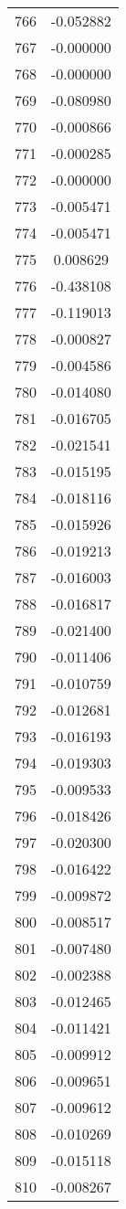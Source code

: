 \documentclass[12pt]{article}
\begin{document}
\begin{longtable}{@{}cc@{}}
766 & -0.052882 \\
767 & -0.000000 \\
768 & -0.000000 \\
769 & -0.080980 \\
770 & -0.000866 \\
771 & -0.000285 \\
772 & -0.000000 \\
773 & -0.005471 \\
774 & -0.005471 \\
775 & 0.008629 \\
776 & -0.438108 \\
777 & -0.119013 \\
778 & -0.000827 \\
779 & -0.004586 \\
780 & -0.014080 \\
781 & -0.016705 \\
782 & -0.021541 \\
783 & -0.015195 \\
784 & -0.018116 \\
785 & -0.015926 \\
786 & -0.019213 \\
787 & -0.016003 \\
788 & -0.016817 \\
789 & -0.021400 \\
790 & -0.011406 \\
791 & -0.010759 \\
792 & -0.012681 \\
793 & -0.016193 \\
794 & -0.019303 \\
795 & -0.009533 \\
796 & -0.018426 \\
797 & -0.020300 \\
798 & -0.016422 \\
799 & -0.009872 \\
800 & -0.008517 \\
801 & -0.007480 \\
802 & -0.002388 \\
803 & -0.012465 \\
804 & -0.011421 \\
805 & -0.009912 \\
806 & -0.009651 \\
807 & -0.009612 \\
808 & -0.010269 \\
809 & -0.015118 \\
810 & -0.008267 \\

\end{longtable}
\end{document}
